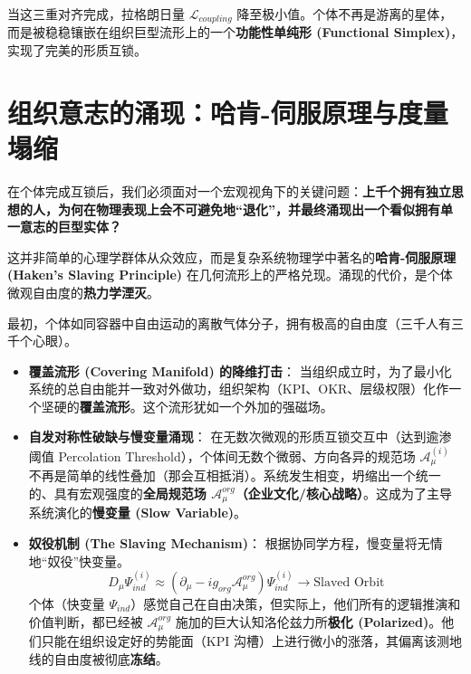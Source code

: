 当这三重对齐完成，拉格朗日量 $\mathcal{L}_{coupling}$ 降至极小值。个体不再是游离的星体，而是被稳稳镶嵌在组织巨型流形上的一个\textbf{功能性单纯形 (Functional Simplex)}，实现了完美的形质互锁。


\section{组织意志的涌现：哈肯-伺服原理与度量塌缩}
\label{sec:emergence_of_organizational_will}

在个体完成互锁后，我们必须面对一个宏观视角下的关键问题：\textbf{上千个拥有独立思想的人，为何在物理表现上会不可避免地“退化”，并最终涌现出一个看似拥有单一意志的巨型实体？}

这并非简单的心理学群体从众效应，而是复杂系统物理学中著名的\textbf{哈肯-伺服原理 (Haken's Slaving Principle)} 在几何流形上的严格兑现。涌现的代价，是个体微观自由度的\textbf{热力学湮灭}。


最初，个体如同容器中自由运动的离散气体分子，拥有极高的自由度（三千人有三千个心眼）。

\begin{itemize}
    \item \textbf{覆盖流形 (Covering Manifold) 的降维打击}：
    当组织成立时，为了最小化系统的总自由能并一致对外做功，组织架构（KPI、OKR、层级权限）化作一个坚硬的\textbf{覆盖流形}。这个流形犹如一个外加的强磁场。

    \item \textbf{自发对称性破缺与慢变量涌现}：
    在无数次微观的形质互锁交互中（达到逾渗阈值 Percolation Threshold），个体间无数个微弱、方向各异的规范场 $\mathcal{A}_\mu^{(i)}$ 不再是简单的线性叠加（那会互相抵消）。系统发生相变，坍缩出一个统一的、具有宏观强度的\textbf{全局规范场 $\mathcal{A}_\mu^{org}$（企业文化/核心战略）}。这成为了主导系统演化的\textbf{慢变量 (Slow Variable)}。

    \item \textbf{奴役机制 (The Slaving Mechanism)}：
    根据协同学方程，慢变量将无情地“奴役”快变量。
    $$ D_\mu \Psi_{ind}^{(i)} \approx \left( \partial_\mu - i g_{org} \mathcal{A}_\mu^{org} \right) \Psi_{ind}^{(i)} \to \text{Slaved Orbit} $$
    个体（快变量 $\Psi_{ind}$）感觉自己在自由决策，但实际上，他们所有的逻辑推演和价值判断，都已经被 $\mathcal{A}_\mu^{org}$ 施加的巨大认知洛伦兹力所\textbf{极化 (Polarized)}。他们只能在组织设定好的势能面（KPI 沟槽）上进行微小的涨落，其偏离该测地线的自由度被彻底\textbf{冻结}。
\end{itemize}

